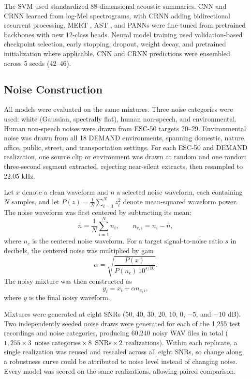 \documentclass[conference]{IEEEtran}
\begin{document}
The SVM used standardized 88-dimensional acoustic summaries. CNN and CRNN learned from log-Mel spectrograms, with CRNN adding bidirectional recurrent processing. MERT \cite{b14}, AST \cite{b15}, and PANNs \cite{b16} were fine-tuned from pretrained backbones with new 12-class heads. Neural model training used validation-based checkpoint selection, early stopping, dropout, weight decay, and pretrained initialization where applicable. CNN and CRNN predictions were ensembled across 5 seeds (42--46).


\subsection{Noise Construction}
\label{sec:noise}
All models were evaluated on the same mixtures. Three noise categories were used: white (Gaussian, spectrally flat), human non-speech, and environmental. Human non-speech noises were drawn from ESC-50 targets 20--29. Environmental noise was drawn from all 18 DEMAND environments, spanning domestic, nature, office, public, street, and transportation settings. For each ESC-50 and DEMAND realization, one source clip or environment was drawn at random and one random three-second segment extracted, rejecting near-silent extracts, then resampled to 22.05 kHz.

Let $x$ denote a clean waveform and $n$ a selected noise waveform, each containing $N$ samples, and let $P(z)=\frac{1}{N}\sum_{i=1}^{N}z_i^{2}$ denote mean-squared waveform power. The noise waveform was first centered by subtracting its mean:
\begin{equation}
\bar{n} = \frac{1}{N}\sum_{i=1}^{N}n_i,
\qquad
n_{c,i} = n_i-\bar{n},
\label{eq:noise_centering}
\end{equation}
where $n_c$ is the centered noise waveform. For a target signal-to-noise ratio $s$ in decibels, the centered noise was multiplied by gain
\begin{equation}
\alpha =
\sqrt{
\frac{P(x)}
{P(n_c)\,10^{s/10}}
}.
\label{eq:noise_gain}
\end{equation}
The noisy mixture was then constructed as
\begin{equation}
y_i = x_i+\alpha n_{c,i},
\label{eq:noise_mixture}
\end{equation}
where $y$ is the final noisy waveform.

Mixtures were generated at eight SNRs (50, 40, 30, 20, 10, 0, $-5$, and $-10$ dB). Two independently seeded noise draws were generated for each of the 1,255 test recordings and noise categories, producing 60,240 noisy WAV files in total ($1{,}255 \times 3\,\text{ noise categories} \times 8\,\text{ SNRs} \times 2\,\text{ realizations}$). Within each replicate, a single realization was reused and rescaled across all eight SNRs, so change along a robustness curve could be attributed to noise level instead of changing noise. Every model was scored on the same realizations, allowing paired comparison.
\end{document}
